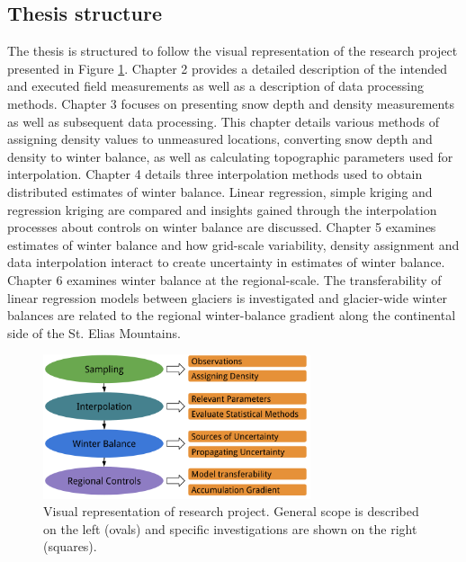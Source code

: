 \documentclass{sfuthesis}
\begin{document}
\subsection{Thesis structure}
The thesis is structured to follow the visual representation of the research project presented in Figure \ref{fig:flowchart_project}. Chapter 2 provides a detailed description of the intended and executed field measurements as well as a description of data processing methods. Chapter 3 focuses on presenting snow depth and density measurements as well as subsequent data processing. This chapter details various methods of assigning density values to unmeasured locations, converting snow depth and density to winter balance, as well as calculating topographic parameters used for interpolation. Chapter 4 details three interpolation methods used to obtain distributed estimates of winter balance. Linear regression, simple kriging and regression kriging are compared and insights gained through the interpolation processes about controls on winter balance are discussed. Chapter 5 examines estimates of winter balance and how grid-scale variability, density assignment and data interpolation interact to create uncertainty in estimates of winter balance. Chapter 6 examines winter balance at the regional-scale. The transferability of linear regression models between glaciers is investigated and glacier-wide winter balances are related to the regional winter-balance gradient along the continental side of the St. Elias Mountains. 

 \begin{figure}[H]
 \centering
           \includegraphics[width =0.7\textwidth]{MastersFlow.png}
       \caption{Visual representation of research project. General scope is described on the left (ovals) and specific investigations are shown on the right (squares).}
       \label{fig:flowchart_project}
\end{figure}
\end{document}
